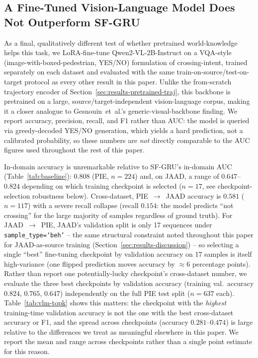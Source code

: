 \subsection{A Fine-Tuned Vision-Language Model Does Not Outperform SF-GRU}
\label{sec:results-vlm}

As a final, qualitatively different test of whether pretrained
world-knowledge helps this task, we LoRA-fine-tune Qwen2-VL-2B-Instruct
on a VQA-style (image-with-boxed-pedestrian, YES/NO) formulation of
crossing-intent, trained separately on each dataset and evaluated with
the same train-on-source/test-on-target protocol as every other result
in this paper. Unlike the from-scratch trajectory encoder of
Section~\ref{sec:results-pretrained-traj}, this backbone is pretrained
on a large, source/target-independent vision-language corpus, making it
a closer analogue to Gesnouin~et~al.'s generic-visual-backbone finding.
We report accuracy, precision, recall, and F1 rather than AUC: the
model is queried via greedy-decoded YES/NO generation, which yields a
hard prediction, not a calibrated probability, so these numbers are
\emph{not} directly comparable to the AUC figures used throughout the
rest of this paper.

In-domain accuracy is unremarkable relative to SF-GRU's in-domain AUC
(Table~\ref{tab:baseline}): $0.808$ (PIE, $n=224$) and, on JAAD, a
range of $0.647$--$0.824$ depending on which training checkpoint is
selected ($n=17$, see checkpoint-selection robustness below).
Cross-dataset, PIE~$\to$~JAAD accuracy is $0.581$ ($n=117$) with a
severe recall collapse (recall $0.154$: the model predicts
``not crossing'' for the large majority of samples regardless of
ground truth). For JAAD~$\to$~PIE, JAAD's validation split is only 17
sequences under \texttt{sample\_type=`beh'} -- the same structural
constraint noted throughout this paper for JAAD-as-source training
(Section~\ref{sec:results-discussion}) -- so selecting a single
``best'' fine-tuning checkpoint by validation accuracy on 17 samples is
itself high-variance (one flipped prediction moves accuracy by
$\approx\!6$ percentage points). Rather than report one
potentially-lucky checkpoint's cross-dataset number, we evaluate the
three best checkpoints by validation accuracy (training val.\ accuracy
$0.824$, $0.765$, $0.647$) independently on the full PIE test split
($n=637$ each). Table~\ref{tab:vlm-topk} shows this matters: the
checkpoint with the \emph{highest} training-time validation accuracy
is not the one with the best cross-dataset accuracy or F1, and the
spread across checkpoints (accuracy $0.281$--$0.474$) is large relative
to the differences we treat as meaningful elsewhere in this paper. We
report the mean and range across checkpoints rather than a single
point estimate for this reason.

